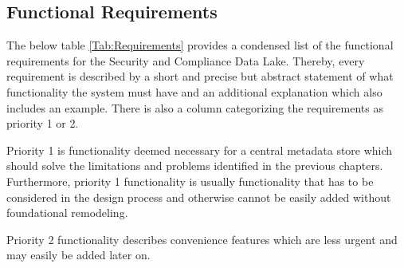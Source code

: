 \subsection{Functional Requirements}
The below table \ref{Tab:Requirements} provides a condensed list of the functional requirements for the Security and Compliance Data Lake. Thereby, every requirement is described by a short and precise but abstract statement of what functionality the system must have and an additional explanation which also includes an example. There is also a column categorizing the requirements as priority 1 or 2.\par 
Priority 1 is functionality deemed necessary for a central metadata store which should solve the limitations and problems identified in the previous chapters. Furthermore, priority 1 functionality is usually functionality that has to be considered in the design process and otherwise cannot be easily added without foundational remodeling.\par
Priority 2 functionality describes convenience features which are less urgent and may easily be added later on.
